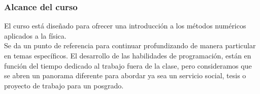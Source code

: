 \begin{frame}
\begin{center}
\end{center}
\end{frame}
\begin{frame}
\frametitle{Alcance del curso}
El curso está diseñado para ofrecer una introducción a los métodos numéricos aplicados a la física.
\\
\medskip
Se da un punto de referencia para continuar profundizando de manera particular en temas específicos. El desarrollo de las habilidades de programación, están en función del tiempo dedicado al trabajo fuera de la clase, pero consideramos que se abren un panorama diferente para abordar ya sea un servicio social, tesis o proyecto de trabajo para un posgrado.
\end{frame}

